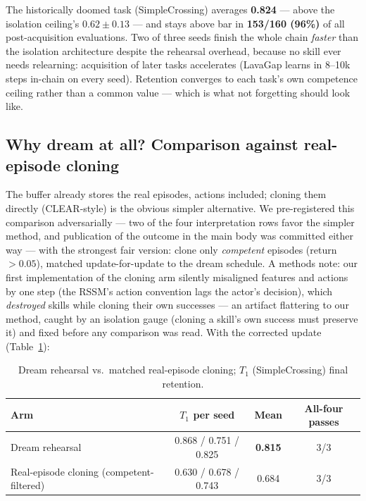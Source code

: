 \documentclass[10pt]{article}
\begin{document}
The historically doomed task (SimpleCrossing) averages \textbf{0.824} --- above the
isolation ceiling's $0.62 \pm 0.13$ --- and stays above bar in \textbf{153/160 (96\%)} of
all post-acquisition evaluations. Two of three seeds finish the whole chain \emph{faster}
than the isolation architecture despite the rehearsal overhead, because no skill ever needs
relearning: acquisition of later tasks accelerates (LavaGap learns in 8--10k steps in-chain
on every seed). Retention converges to each task's own competence ceiling rather than a
common value --- which is what not forgetting should look like.

\subsection{Why dream at all? Comparison against real-episode cloning}
The buffer already stores the real episodes, actions included; cloning them directly
(CLEAR-style) is the obvious simpler alternative. We pre-registered this comparison
adversarially --- two of the four interpretation rows favor the simpler method, and
publication of the outcome in the main body was committed either way --- with the strongest
fair version: clone only \emph{competent} episodes (return $> 0.05$), matched
update-for-update to the dream schedule. A methods note: our first implementation of the
cloning arm silently misaligned features and actions by one step (the RSSM's action
convention lags the actor's decision), which \emph{destroyed} skills while cloning their own
successes --- an artifact flattering to our method, caught by an isolation gauge (cloning a
skill's own success must preserve it) and fixed before any comparison was read. With the
corrected update (Table~\ref{tab:ablation}):

\begin{table}[h]
\centering
\small
\begin{tabular}{lccc}
\toprule
Arm & $T_1$ per seed & Mean & All-four passes \\
\midrule
Dream rehearsal & 0.868 / 0.751 / 0.825 & \textbf{0.815} & 3/3 \\
Real-episode cloning (competent-filtered) & 0.630 / 0.678 / 0.743 & 0.684 & 3/3 \\
\bottomrule
\end{tabular}
\caption{Dream rehearsal vs.\ matched real-episode cloning; $T_1$ (SimpleCrossing) final
retention.}
\label{tab:ablation}
\end{table}
\end{document}
